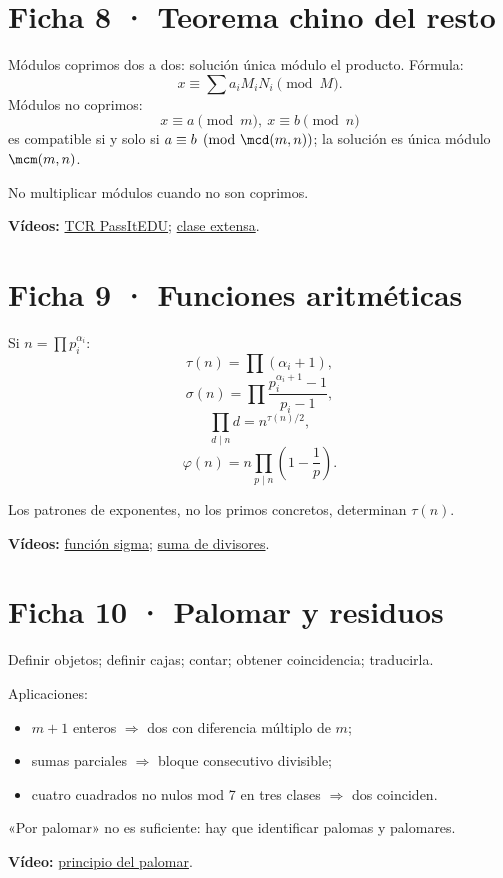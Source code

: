 \documentclass[10pt,a4paper,openany]{report}
\begin{document}
\section*{Ficha 8 · Teorema chino del resto}
Módulos coprimos dos a dos: solución única módulo el producto. Fórmula:
\[
x\equiv\sum a_iM_iN_i\pmod M.
\]
Módulos no coprimos:
\[
x\equiv a\pmod m,\ x\equiv b\pmod n
\]
es compatible si y solo si $a\equiv b\pmod{\mcd(m,n)}$; la solución es única módulo $\mcm(m,n)$.
\begin{alerta}No multiplicar módulos cuando no son coprimos.\end{alerta}
\textbf{Vídeos:} \href{https://www.youtube.com/watch?v=oN9qrQ-i16k}{TCR PassItEDU}; \href{https://www.youtube.com/watch?v=v8XsnE1_u70}{clase extensa}.
\clearpage

\section*{Ficha 9 · Funciones aritméticas}
Si $n=\prod p_i^{\alpha_i}$:
\[
\tau(n)=\prod(\alpha_i+1),
\]
\[
\sigma(n)=\prod\frac{p_i^{\alpha_i+1}-1}{p_i-1},
\]
\[
\prod_{d\mid n}d=n^{\tau(n)/2},
\]
\[
\varphi(n)=n\prod_{p\mid n}\left(1-\frac1p\right).
\]
\begin{alerta}Los patrones de exponentes, no los primos concretos, determinan $\tau(n)$.\end{alerta}
\textbf{Vídeos:} \href{https://www.youtube.com/watch?v=lgtovETcnbU}{función sigma}; \href{https://www.youtube.com/watch?v=osuEhzJlsGM}{suma de divisores}.
\clearpage

\section*{Ficha 10 · Palomar y residuos}
\begin{ruta}
Definir objetos; definir cajas; contar; obtener coincidencia; traducirla.
\end{ruta}
Aplicaciones:
\begin{itemize}
\item $m+1$ enteros $\Rightarrow$ dos con diferencia múltiplo de $m$;
\item sumas parciales $\Rightarrow$ bloque consecutivo divisible;
\item cuatro cuadrados no nulos mod 7 en tres clases $\Rightarrow$ dos coinciden.
\end{itemize}
\begin{alerta}«Por palomar» no es suficiente: hay que identificar palomas y palomares.\end{alerta}
\textbf{Vídeo:} \href{https://www.youtube.com/watch?v=gyLtyPm49-c}{principio del palomar}.
\clearpage
\end{document}
